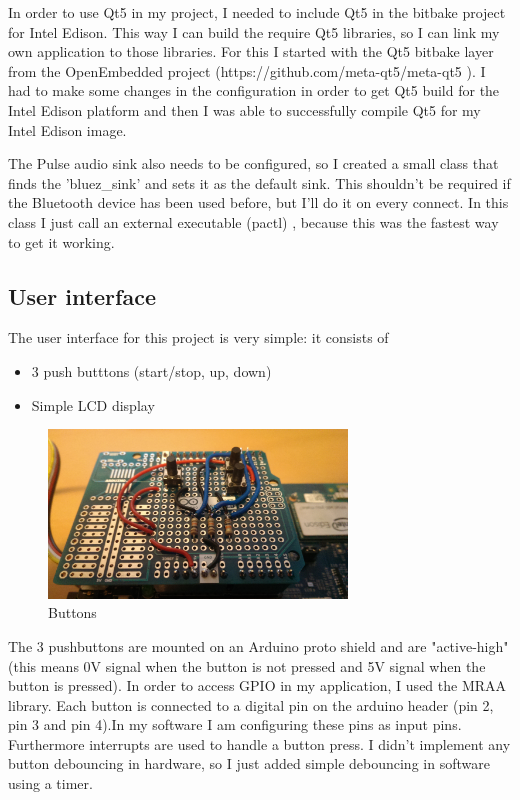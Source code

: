 \documentclass[12pt,a4paper]{scrreprt}
\begin{document}
In order to use Qt5 in my project, I needed to include Qt5 in the bitbake project for Intel Edison. This way I can build the require Qt5 libraries, so I can link my own application to those libraries.
For this I started with the Qt5 bitbake layer from the OpenEmbedded project (https://github.com/meta-qt5/meta-qt5 ). I had to make some changes in the configuration in order to get Qt5 build for the Intel Edison platform and then I was able to successfully compile Qt5 for my Intel Edison image. 

The Pulse audio sink also needs to be configured, so I created a small class that finds the 'bluez\_sink' and sets it as the default sink. This shouldn't be required if the Bluetooth device has been used before, but I'll do it on every connect. In this class I just call an external executable (pactl) , because this was the fastest way to get it working.

\subsection{User interface}
The user interface for this project is very simple: it consists of
\begin{itemize}
	\item 3 push butttons (start/stop, up, down)
	\item Simple LCD display 
\end{itemize}

\begin{figure}[h]
	\includegraphics[width=300px]{images/buttons1}
	\caption{Buttons}
\end{figure}

The 3 pushbuttons are mounted on an Arduino proto shield and are "active-high" (this means 0V signal when the button is not pressed and 5V signal when the button is pressed).
In order to access GPIO in my application, I used the MRAA library.
Each button is connected to a digital pin on the arduino header (pin 2, pin 3 and pin 4).In my software I am configuring these pins as input pins. Furthermore interrupts are used to handle a button press.
I didn't implement any button debouncing in hardware, so I just added simple debouncing in software using a timer.
\end{document}
